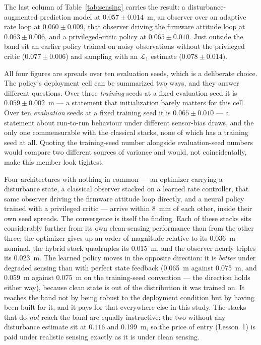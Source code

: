 The last column of Table~\ref{tab:sensing} carries the result: a disturbance-augmented
prediction model at $0.057\pm0.014$~\si{\meter}, an observer over an adaptive rate loop
at $0.060\pm0.009$, that observer driving the firmware attitude loop at
$0.063\pm0.006$, and a privileged-critic policy at $0.065\pm0.010$. Just outside the
band sit an earlier policy trained on noisy observations without the privileged critic
($0.077\pm0.006$) and sampling with an $\mathcal{L}_1$ estimate ($0.078\pm0.014$).

All four figures are spreads over ten evaluation seeds, which is a deliberate choice.
The policy's deployment cell can be summarized two ways, and they answer different
questions. Over three \emph{training} seeds at a fixed evaluation seed it is
$0.059\pm0.002$~\si{\meter} --- a statement that initialization barely matters for this
cell. Over ten \emph{evaluation} seeds at a fixed training seed it is
$0.065\pm0.010$ --- a statement about run-to-run behaviour under different sensor-bias
draws, and the only one commensurable with the classical stacks, none of which has a
training seed at all. Quoting the training-seed number alongside evaluation-seed
numbers would compare two different sources of variance and would, not coincidentally,
make this member look tightest.

\noindent Four architectures with nothing in common --- an optimizer carrying a
disturbance state, a classical observer stacked on a learned rate controller, that same
observer driving the firmware attitude loop directly, and a neural policy trained with a
privileged critic --- arrive within \SI{8}{\milli\meter} of each other, inside their own
seed spreads. The convergence is itself the finding. Each of these stacks sits
considerably further from its own clean-sensing performance than from the other three:
the optimizer gives up an order of magnitude relative to its \SI{0.036}{\meter} nominal,
the hybrid stack quadruples its \SI{0.015}{\meter}, and the observer nearly triples its
\SI{0.023}{\meter}. The learned policy moves in the opposite direction: it is
\emph{better} under degraded sensing than with perfect state feedback
(\SI{0.065}{\meter} against \SI{0.075}{\meter}, and \SI{0.059}{\meter} against
\SI{0.075}{\meter} on the training-seed convention --- the direction holds either way),
because clean state is out of the distribution it was trained on. It reaches the band
not by being robust to the deployment condition but by having been built for it, and it
pays for that everywhere else in this study. The stacks that do \emph{not} reach the
band are equally instructive: the two without any disturbance estimate sit at $0.116$
and \SI{0.199}{\meter}, so the price of entry (Lesson~1) is paid under realistic sensing
exactly as it is under clean sensing.

